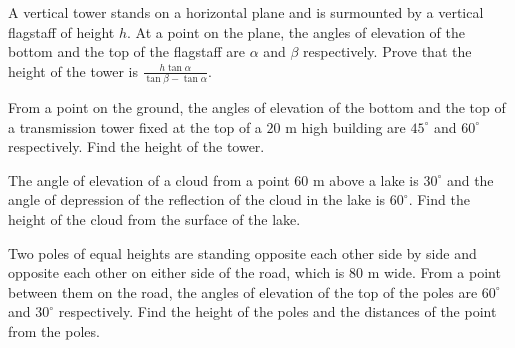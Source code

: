 \documentclass[12pt,a4paper]{exam}
\begin{document}
\begin{questions}
\question[5] A vertical tower stands on a horizontal plane and is surmounted by a vertical flagstaff of height $h$. At a point on the plane, the angles of elevation of the bottom and the top of the flagstaff are $\alpha$ and $\beta$ respectively. Prove that the height of the tower is $\frac{h \tan \alpha}{\tan \beta - \tan \alpha}$.
\vspace{0.15cm}

\question[5] From a point on the ground, the angles of elevation of the bottom and the top of a transmission tower fixed at the top of a $20 \text{ m}$ high building are $45^\circ$ and $60^\circ$ respectively. Find the height of the tower.
\vspace{0.15cm}

\question[5] The angle of elevation of a cloud from a point $60 \text{ m}$ above a lake is $30^\circ$ and the angle of depression of the reflection of the cloud in the lake is $60^\circ$. Find the height of the cloud from the surface of the lake.
\vspace{0.15cm}

\question[5] Two poles of equal heights are standing opposite each other side by side and opposite each other on either side of the road, which is $80 \text{ m}$ wide. From a point between them on the road, the angles of elevation of the top of the poles are $60^\circ$ and $30^\circ$ respectively. Find the height of the poles and the distances of the point from the poles.
\vspace{0.15cm}

\end{questions}
\bigskip
\end{document}
